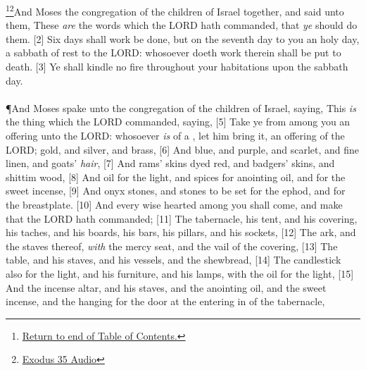 \footnote{\textcolor[cmyk]{0.99998,1,0,0}{\hyperlink{TOC}{Return to end of Table of Contents.}}}\footnote{\href{https://audiobible.com/bible/exodus_35.html}{\textcolor[cmyk]{0.99998,1,0,0}{Exodus 35 Audio}}}\textcolor[cmyk]{0.99998,1,0,0}{And Moses    the congregation of the children of Israel together, and said unto them, These \emph{are} the words which the LORD hath commanded, that \emph{ye} should do them.}
[2] \textcolor[cmyk]{0.99998,1,0,0}{Six days shall work be done, but on the seventh day  to you an holy day, a sabbath of rest to the LORD: whosoever doeth work therein shall be put to death.}
[3] \textcolor[cmyk]{0.99998,1,0,0}{Ye shall kindle no fire throughout your habitations upon the sabbath day.}\\
\\
\P \textcolor[cmyk]{0.99998,1,0,0}{And Moses spake unto   the congregation of the children of Israel, saying, This \emph{is} the thing which the LORD commanded, saying,}
[5] \textcolor[cmyk]{0.99998,1,0,0}{Take ye from among you an offering unto the LORD: whosoever \emph{is} of a , let him bring it, an offering of the LORD; gold, and silver, and brass,}
[6] \textcolor[cmyk]{0.99998,1,0,0}{And blue, and purple, and scarlet, and fine linen, and goats' \emph{hair},}
[7] \textcolor[cmyk]{0.99998,1,0,0}{And rams' skins dyed red, and badgers' skins, and shittim wood,}
[8] \textcolor[cmyk]{0.99998,1,0,0}{And oil for the light, and spices for anointing oil, and for the sweet incense,}
[9] \textcolor[cmyk]{0.99998,1,0,0}{And onyx stones, and stones to be set for the ephod, and for the breastplate.}
[10] \textcolor[cmyk]{0.99998,1,0,0}{And every wise hearted among you shall come, and make   that the LORD hath commanded;}
[11] \textcolor[cmyk]{0.99998,1,0,0}{The tabernacle, his tent, and his covering, his taches, and his boards, his bars, his pillars, and his sockets,}
[12] \textcolor[cmyk]{0.99998,1,0,0}{The ark, and the staves thereof, \emph{with} the mercy seat, and the vail of the covering,}
[13] \textcolor[cmyk]{0.99998,1,0,0}{The table, and his staves, and   his vessels, and the shewbread,}
[14] \textcolor[cmyk]{0.99998,1,0,0}{The candlestick also for the light, and his furniture, and his lamps, with the oil for the light,}
[15] \textcolor[cmyk]{0.99998,1,0,0}{And the incense altar, and his staves, and the anointing oil, and the sweet incense, and the hanging for the door at the entering in of the tabernacle,}
